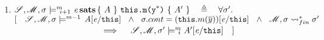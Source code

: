 \begin{definition}
\begin{enumerate}
\item
$ {\mathcal{S}}, {\mathcal M}, \sigma \models^{m} \!\!\!\!_{i+1} \ {\mathit{e}\, \textbf{sats} \, \{ \ A  \ \} \   \mbox{\normalfont{\texttt{this.m(y}}}^*\mbox{\normalfont{\texttt{)}}} \  \{ \  A'  \ \} }
 \ \ \ \triangleq \ \ \
 \forall \sigma'. $\\
$ [ \  \  \ \satM   {\sigma} {m-1}  {A[\re/\prg{this}]}\ \ \wedge\ \  \sigma.cont=(\prg{this}.m(\overline y))[\re/\prg{this}] \ \ \wedge\ \
\Mod, \sigma\leadsto^*_{fin} \sigma'  $\\
$\strut \hspace{3cm} \hfill \ \   \ \  \  \Longrightarrow\ \ \ \  \satMN  {\sigma'} m {i}  {A'[\re/\prg{this}] }\ \ \ ]$

\end{enumerate}

 \end{definition} 

 
% 
% 
% 
%
% 
% 
